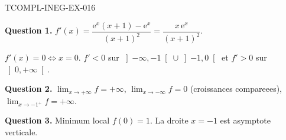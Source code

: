\begin{corrige}{TCOMPL-INEG-EX-016}

\textbf{Question 1.} $f'(x) = \dfrac{\mathrm{e}^x(x+1) - \mathrm{e}^x}{(x+1)^2} = \dfrac{x\,\mathrm{e}^x}{(x+1)^2}$.


$f'(x) = 0 \iff x = 0$. $f' < 0$ sur $\left]-\infty, -1\right[ \cup \left]-1, 0\right[$ et $f' > 0$ sur $\left]0, +\infty\right[$.

\textbf{Question 2.} $\lim_{x \to +\infty} f = +\infty$, $\lim_{x \to -\infty} f = 0$ (croissances compareees), $\lim_{x \to -1^+} f = +\infty$.

\textbf{Question 3.} Minimum local $f(0) = 1$. La droite $x = -1$ est asymptote verticale.

\end{corrige}
